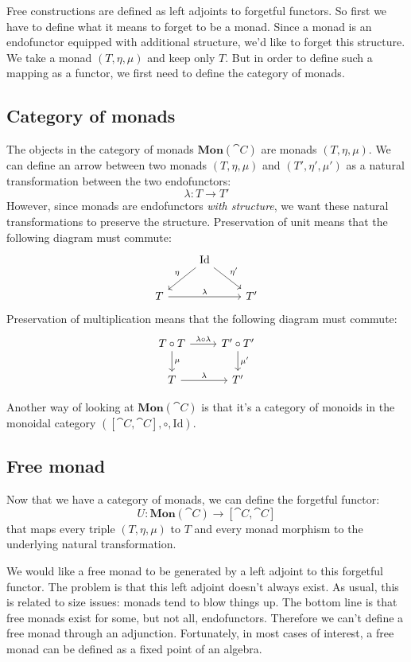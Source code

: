 \documentclass[DaoFP]{subfiles}
\begin{document}
Free constructions are defined as left adjoints to forgetful functors. So first we have to define what it means to forget to be a monad. Since a monad is an endofunctor equipped with additional structure, we'd like to forget this structure. We take a monad $(T, \eta, \mu)$ and keep only $T$. But in order to define such a mapping as a functor, we first need to define the category of monads.

\subsection{Category of monads}

The objects in the category of monads $\mathbf{Mon}(\cat C)$ are monads $(T, \eta, \mu)$. We can define an arrow between two monads $(T, \eta, \mu)$ and $(T', \eta', \mu')$ as a natural transformation between the two endofunctors:
\[ \lambda \colon T \to T' \]
However, since monads are endofunctors \emph{with structure}, we want these natural transformations to preserve the structure. Preservation of unit means that the following diagram must commute:
\[
 \begin{tikzcd}
&\text{Id}
 \arrow[ld, "\eta"']
 \arrow[rd, "\eta'"]
 \\
 T
 \arrow[rr, "\lambda"]
 && T'
 \end{tikzcd}
\]
Preservation of multiplication means that the following diagram must commute:
\[
 \begin{tikzcd}
 T \circ T
 \arrow[r, "\lambda \circ \lambda"]
 \arrow[d, "\mu"]
 & T' \circ T'
 \arrow[d, "\mu'"]
 \\
 T
 \arrow[r, "\lambda"]
 & T'
 \end{tikzcd}
\]

Another way of looking at $\mathbf{Mon}(\cat C)$ is that it's a category of monoids in the monoidal category $([\cat C, \cat C], \circ, \text{Id})$. 

\subsection{Free monad}

Now that we have a category of monads, we can define the forgetful functor:
\[ U \colon \mathbf{Mon}(\cat C) \to [\cat C, \cat C] \]
that maps every triple $(T, \eta, \mu)$ to $T$ and every monad morphism to the underlying natural transformation.

We would like a free monad to be generated by a left adjoint to this forgetful functor. The problem is that this left adjoint doesn't always exist. As usual, this is related to size issues: monads tend to blow things up. The bottom line is that free monads exist for some, but not all, endofunctors. Therefore we can't define a free monad through an adjunction. Fortunately, in most cases of interest, a free monad can be defined as a fixed point of an algebra. 
\end{document}
